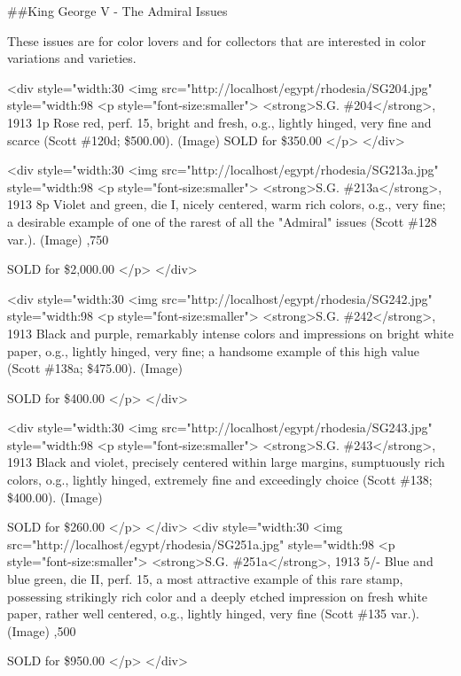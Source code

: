 
\#\#King George V - The Admiral Issues

These issues are for color lovers and for collectors that are interested in color 
variations and varieties.

<div style="width:30%
<img src="http://localhost/egypt/rhodesia/SG204.jpg" style="width:98%
<p style="font-size:smaller"> 
<strong>S.G. \#204</strong>, 1913 1p Rose red, perf. 15,
 bright and fresh, o.g., lightly hinged, 
 very fine and scarce (Scott \#120d; \$500.00). (Image) 	
SOLD for \$350.00 	
</p>
</div>

<div style="width:30%
<img src="http://localhost/egypt/rhodesia/SG213a.jpg" style="width:98%
<p style="font-size:smaller"> 
<strong>S.G. \#213a</strong>, 1913 8p Violet and green, 
die I, nicely centered, warm rich colors, 
o.g., very fine; a desirable example of one of the rarest of all the "Admiral" issues (Scott \#128 var.). (Image) 	,750

SOLD for \$2,000.00	
</p>
</div>

<div style="width:30%
<img src="http://localhost/egypt/rhodesia/SG242.jpg" style="width:98%
<p style="font-size:smaller"> 
<strong>S.G. \#242</strong>, 1913  Black and purple, 
remarkably intense colors and impressions on bright white paper, o.g., 
lightly hinged, very fine; a handsome example of this high value (Scott \#138a; \$475.00). (Image) 

SOLD for \$400.00 	
</p>
</div>

<div style="width:30%
<img src="http://localhost/egypt/rhodesia/SG243.jpg" style="width:98%
<p style="font-size:smaller"> 
<strong>S.G. \#243</strong>, 1913  Black and violet, precisely centered within large margins, sumptuously rich colors, o.g., lightly hinged, extremely fine and exceedingly choice (Scott \#138; \$400.00). (Image) 	

SOLD for \$260.00 	
</p>
</div>
<div style="width:30%
<img src="http://localhost/egypt/rhodesia/SG251a.jpg" style="width:98%
<p style="font-size:smaller"> 
<strong>S.G. \#251a</strong>, 1913 5/- Blue and blue green, die II, perf. 15, a most attractive example of this rare stamp, possessing strikingly rich color and a deeply etched impression on fresh white paper, rather well centered, o.g., lightly hinged, very fine (Scott \#135 var.). (Image) 	,500

SOLD for \$950.00 	
</p>
</div>

